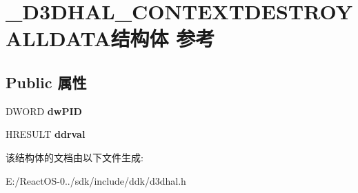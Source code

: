 \hypertarget{struct___d3_d_h_a_l___c_o_n_t_e_x_t_d_e_s_t_r_o_y_a_l_l_d_a_t_a}{}\section{\+\_\+\+D3\+D\+H\+A\+L\+\_\+\+C\+O\+N\+T\+E\+X\+T\+D\+E\+S\+T\+R\+O\+Y\+A\+L\+L\+D\+A\+T\+A结构体 参考}
\label{struct___d3_d_h_a_l___c_o_n_t_e_x_t_d_e_s_t_r_o_y_a_l_l_d_a_t_a}
\subsection*{Public 属性}
\begin{DoxyCompactItemize}
\item 
\mbox{\label{struct___d3_d_h_a_l___c_o_n_t_e_x_t_d_e_s_t_r_o_y_a_l_l_d_a_t_a_af04b74409ce32b608723fcb05ae8a7ed}} 
D\+W\+O\+RD {\bfseries dw\+P\+ID}
\item 
\mbox{\label{struct___d3_d_h_a_l___c_o_n_t_e_x_t_d_e_s_t_r_o_y_a_l_l_d_a_t_a_aee1386c1060219bfdb6a030f63e535e6}} 
H\+R\+E\+S\+U\+LT {\bfseries ddrval}
\end{DoxyCompactItemize}


该结构体的文档由以下文件生成\+:\begin{DoxyCompactItemize}
\item 
E\+:/\+React\+O\+S-\/0../sdk/include/ddk/d3dhal.\+h\end{DoxyCompactItemize}
